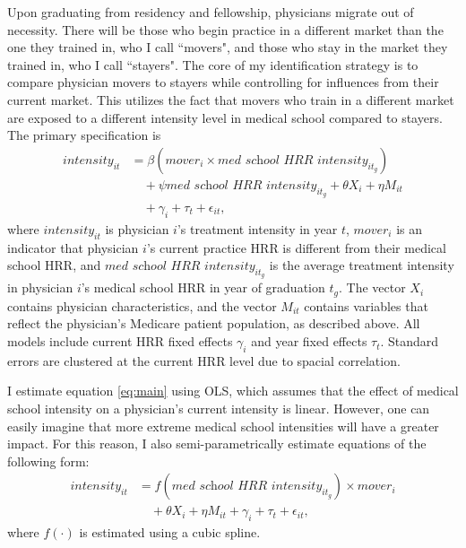 
Upon graduating from residency and fellowship, physicians migrate out of necessity. There will be those who begin practice in a different market than the one they trained in, who I call ``movers", and those who stay in the market they trained in, who I call ``stayers". The core of my identification strategy is to compare physician movers to stayers while controlling for influences from their current market. This utilizes the fact that movers who train in a different market are exposed to a different intensity level in medical school compared to stayers. The primary specification is 
    \begin{align} \label{eq:main}
        intensity_{it} 
        &= \beta (mover_i \times \textit{med school HRR intensity}_{it_g}) \nonumber\\
        &\quad + \psi \textit{med school HRR intensity}_{it_g} + \theta X_{i} + \eta M_{it} \nonumber\\
        &\quad + \gamma_i + \tau_t + \epsilon_{it},
    \end{align}
where $intensity_{it}$ is physician $i$'s treatment intensity in year $t$, $mover_i$ is an indicator that physician $i$'s current practice HRR is different from their medical school HRR, and $\textit{med school HRR intensity}_{it_g}$ is the average treatment intensity in physician $i$'s medical school HRR in year of graduation $t_g$. The vector $X_i$ contains physician characteristics, and the vector $M_{it}$ contains variables that reflect the physician's Medicare patient population, as described above. All models include current HRR fixed effects $\gamma_i$ and year fixed effects $\tau_t$. Standard errors are clustered at the current HRR level due to spacial correlation. 

I estimate equation \ref{eq:main} using OLS, which assumes that the effect of medical school intensity on a physician's current intensity is linear. However, one can easily imagine that more extreme medical school intensities will have a greater impact. For this reason, I also semi-parametrically estimate equations of the following form: 
    \begin{align} \label{eq:spline}
        intensity_{it} 
        &= f(\textit{med school HRR intensity}_{it_g}) \times mover_i \nonumber\\
        &\quad + \theta X_{i} + \eta M_{it} + \gamma_i + \tau_t + \epsilon_{it},
    \end{align}
where $f(\cdot)$ is estimated using a cubic spline. 

